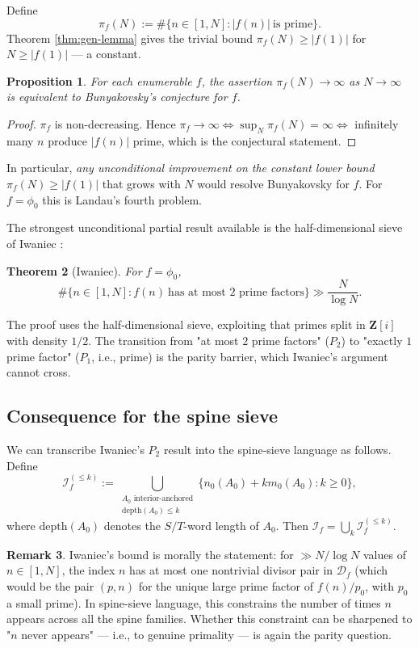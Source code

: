 \documentclass[11pt]{article}
\newtheorem{theorem}{Theorem}[section]
\newtheorem{proposition}[theorem]{Proposition}
\theoremstyle{definition}
\newtheorem{remark}[theorem]{Remark}
\newcommand{\Z}{\mathbf{Z}}
\newcommand{\Df}{\mathcal{D}_f}
\begin{document}
Define
\[
\pi_f(N) := \#\{n \in [1,N] : |f(n)|\ \text{is prime}\}.
\]
Theorem \ref{thm:gen-lemma} gives the trivial bound $\pi_f(N) \ge |f(1)|$ for $N \ge |f(1)|$ — a constant.

\begin{proposition}\label{prop:landau-equivalent}
For each enumerable $f$, the assertion $\pi_f(N) \to \infty$ as $N \to \infty$ is equivalent to Bunyakovsky's conjecture for $f$.
\end{proposition}

\begin{proof}
$\pi_f$ is non-decreasing. Hence $\pi_f \to \infty \iff \sup_N \pi_f(N) = \infty \iff $ infinitely many $n$ produce $|f(n)|$ prime, which is the conjectural statement.
\end{proof}

In particular, \emph{any unconditional improvement on the constant lower bound} $\pi_f(N) \ge |f(1)|$ that grows with $N$ would resolve Bunyakovsky for $f$. For $f = \phi_0$ this is Landau's fourth problem.

The strongest unconditional partial result available is the half-dimensional sieve of Iwaniec \cite{iwaniec1978}:

\begin{theorem}[Iwaniec]\label{thm:iwaniec}
For $f = \phi_0$,
\[
\#\{n \in [1,N] : f(n)\ \text{has at most $2$ prime factors}\} \gg \frac{N}{\log N}.
\]
\end{theorem}

The proof uses the half-dimensional sieve, exploiting that primes split in $\Z[i]$ with density $1/2$. The transition from "at most $2$ prime factors" ($P_2$) to "exactly $1$ prime factor" ($P_1$, i.e., prime) is the parity barrier, which Iwaniec's argument cannot cross.

\subsection{Consequence for the spine sieve}

We can transcribe Iwaniec's $P_2$ result into the spine-sieve language as follows. Define
\[
\mathcal{I}_f^{(\le k)} := \bigcup_{\substack{A_0 \text{ interior-anchored} \\ \text{depth}(A_0) \le k}} \{n_0(A_0) + k m_0(A_0) : k \ge 0\},
\]
where $\text{depth}(A_0)$ denotes the $S/T$-word length of $A_0$. Then $\mathcal{I}_f = \bigcup_k \mathcal{I}_f^{(\le k)}$.

\begin{remark}
Iwaniec's bound is morally the statement: for $\gg N/\log N$ values of $n \in [1,N]$, the index $n$ has at most one nontrivial divisor pair in $\Df$ (which would be the pair $(p,n)$ for the unique large prime factor of $f(n)/p_0$, with $p_0$ a small prime). In spine-sieve language, this constrains the number of times $n$ appears across all the spine families. Whether this constraint can be sharpened to "$n$ never appears" — i.e., to genuine primality — is again the parity question.
\end{remark}
\end{document}
